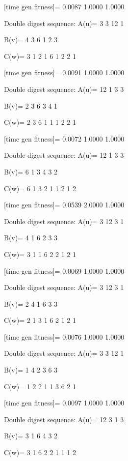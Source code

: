 [time gen fitness]=
    0.0087    1.0000    1.0000

Double digest sequence:
A(u)=
     3     3    12     1

B(v)=
     4     3     6     1     2     3

C(w)=
     3     1     2     1     6     1     2     2     1

[time gen fitness]=
    0.0091    1.0000    1.0000

Double digest sequence:
A(u)=
    12     1     3     3

B(v)=
     2     3     6     3     4     1

C(w)=
     2     3     6     1     1     1     2     2     1

[time gen fitness]=
    0.0072    1.0000    1.0000

Double digest sequence:
A(u)=
    12     1     3     3

B(v)=
     6     1     3     4     3     2

C(w)=
     6     1     3     2     1     1     2     1     2

[time gen fitness]=
    0.0539    2.0000    1.0000

Double digest sequence:
A(u)=
     3    12     3     1

B(v)=
     4     1     6     2     3     3

C(w)=
     3     1     1     6     2     2     1     2     1

[time gen fitness]=
    0.0069    1.0000    1.0000

Double digest sequence:
A(u)=
     3    12     3     1

B(v)=
     2     4     1     6     3     3

C(w)=
     2     1     3     1     6     2     1     2     1

[time gen fitness]=
    0.0076    1.0000    1.0000

Double digest sequence:
A(u)=
     3     3    12     1

B(v)=
     1     4     2     3     6     3

C(w)=
     1     2     2     1     1     3     6     2     1

[time gen fitness]=
    0.0097    1.0000    1.0000

Double digest sequence:
A(u)=
    12     3     1     3

B(v)=
     3     1     6     4     3     2

C(w)=
     3     1     6     2     2     1     1     1     2

